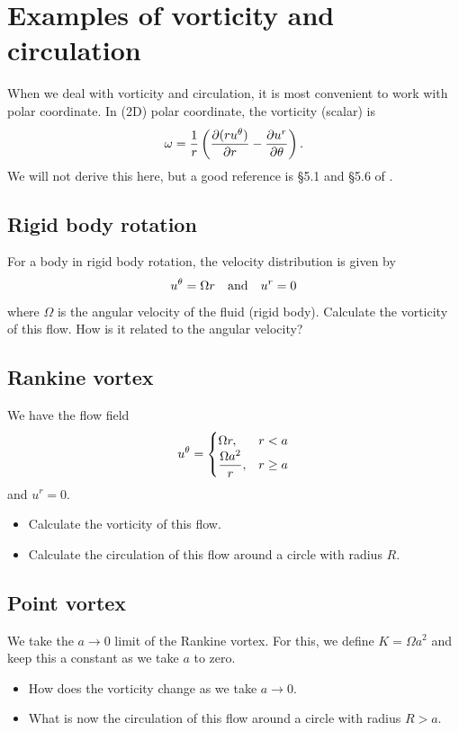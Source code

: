 \documentclass[11pt,letterpaper]{article}
\begin{document}
\section{Examples of vorticity and circulation}
When we deal with vorticity and circulation, it is most convenient to work with polar coordinate. In (2D) polar coordinate, the vorticity (scalar) is
\begin{align}
    \omega = \frac{1}{r}\left( \frac{\partial (ru^\theta)}{\partial r}-\frac{\partial u^r}{\partial \theta} \right).
\end{align}
We will not derive this here, but a good reference is \S 5.1 and \S 5.6 of \cite{Brannon_04}. 

\subsection{Rigid body rotation}
For a body in rigid body rotation, the velocity distribution is given by
\begin{align}
    u^\theta = \Omega r \quad \mbox{and} \quad u^r = 0
\end{align}
where $\Omega$ is the angular velocity of the fluid (rigid body). Calculate the vorticity of this flow. How is it related to the angular velocity?

\subsection{Rankine vortex}
We have the flow field
\begin{align}
    u^\theta = \begin{cases}
        \Omega r, & r<a\\
        \displaystyle{\frac{\Omega a^2}{r}}, & r\geq a
    \end{cases}
\end{align}
and $u^r = 0$. 
\begin{itemize}
    \item Calculate the vorticity of this flow.
    \item Calculate the circulation of this flow around a circle with radius $R$.
\end{itemize}

\subsection{Point vortex}
We take the $a\to 0$ limit of the Rankine vortex. For this, we define $K = \Omega a^2$ and keep this a constant as we take $a$ to zero. 
\begin{itemize}
    \item How does the vorticity change as we take $a\to 0$.
    \item What is now the circulation of this flow around a circle with radius $R>a$.
\end{itemize}
\end{document}
